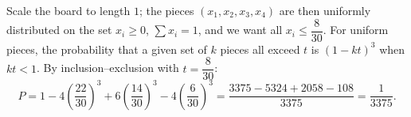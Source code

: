 Scale the board to length $1$; the pieces $(x_1,x_2,x_3,x_4)$ are then uniformly distributed on the set $x_i\ge0$, $\sum x_i=1$, and we want all $x_i\le\dfrac{8}{30}$. For uniform pieces, the probability that a given set of $k$ pieces all exceed $t$ is $(1-kt)^3$ when $kt<1$. By inclusion--exclusion with $t=\dfrac{8}{30}$:
\[P=1-4\left(\dfrac{22}{30}\right)^3+6\left(\dfrac{14}{30}\right)^3-4\left(\dfrac{6}{30}\right)^3=\dfrac{3375-5324+2058-108}{3375}=\boxed{\dfrac{1}{3375}}.\]
